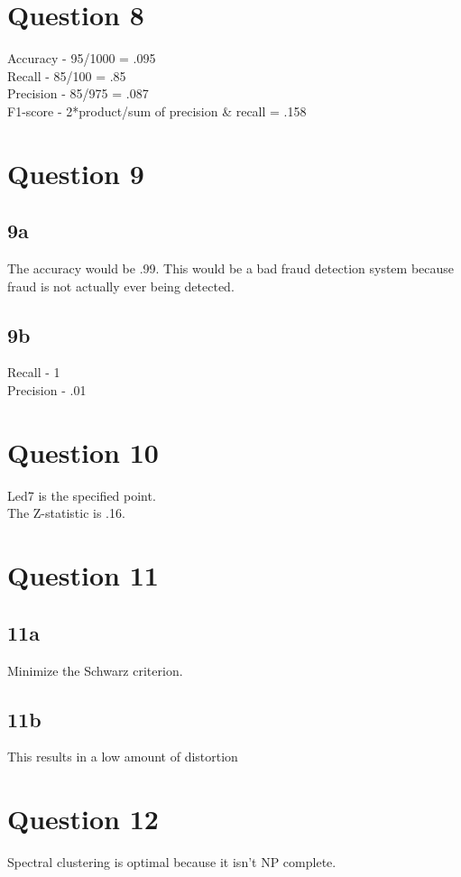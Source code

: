 \documentclass{article}
\begin{document}
\section{Question 8}
Accuracy - 95/1000 = .095\\
Recall - 85/100 = .85\\
Precision - 85/975 = .087\\
F1-score - 2*product/sum of precision \& recall = .158

\section{Question 9}

\subsection{9a}
The accuracy would be .99. This would be a bad fraud detection system because fraud is not actually ever being detected.

\subsection{9b}

Recall - 1\\
Precision - .01

\section{Question 10}
Led7 is the specified point.\\

\noindent The Z-statistic is .16.

\section {Question 11}

\subsection{11a}
Minimize the Schwarz criterion.

\subsection{11b}
This results in a low amount of distortion


\section{Question 12}
Spectral clustering is optimal because it isn't NP complete.
\end{document}
